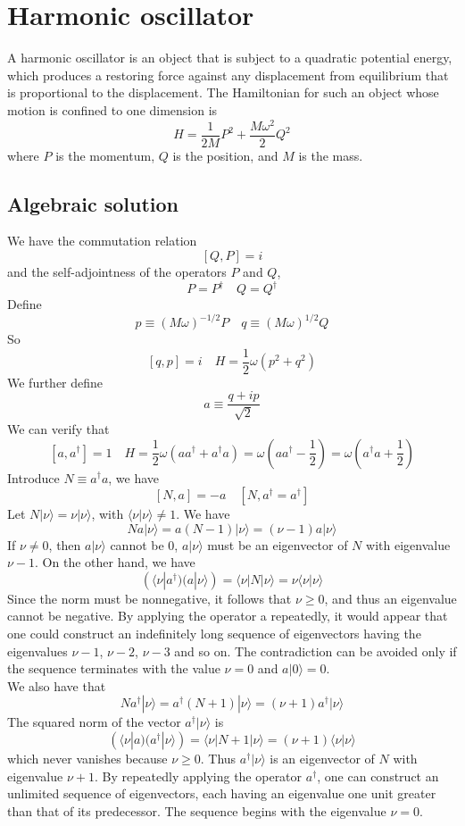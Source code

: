 \section{Harmonic oscillator}
A harmonic oscillator is an object that is subject to a quadratic potential energy, which produces a restoring force against any displacement from equilibrium that is proportional to the displacement. The Hamiltonian for such an object whose motion is confined to one dimension is
\[H = \frac{1}{2M}P^2 + \frac{M\omega^2}{2}Q^2\]
where $P$ is the momentum, $Q$ is the position, and $M$ is the mass.
\subsection{Algebraic solution}
We have the commutation relation
\[[Q,P] = i\]
and the self-adjointness of the operators $P$ and $Q$,
\[P = P^{\dagger} \quad Q = Q^{\dagger}\]
Define
\[ p \equiv (M\omega)^{-1/2}P \quad q \equiv (M\omega)^{1/2}Q\]
So
\[[q,p] = i \quad H = \frac{1}{2}\omega(p^2+q^2)\]
We further define
\[a \equiv \frac{q+ip}{\sqrt{2}}\]
We can verify that
\[[a,a^{\dagger}] = 1 \quad H = \frac{1}{2}\omega(aa^{\dagger}+a^{\dagger}a) = \omega(aa^{\dagger}-\frac{1}{2}) = \omega(a^{\dagger}a+\frac{1}{2})\]
Introduce $N \equiv a^{\dagger}a$, we have
\[[N,a] = -a \quad [N,a^{\dagger} = a^{\dagger}]\]
Let $N|\nu\rangle = \nu|\nu\rangle $, with $\langle \nu | \nu \rangle \neq 1$. We have
\[Na|\nu\rangle = a(N-1)|\nu\rangle = (\nu-1)a|\nu\rangle\]
If $\nu \neq 0$, then $a|\nu\rangle$ cannot be $0$, $a|\nu\rangle$ must be an eigenvector of $N$ with eigenvalue $\nu - 1$.
On the other hand, we have
\[(\langle \nu | a^{\dagger})(a|\nu\rangle) = \langle \nu | N | \nu \rangle = \nu \langle \nu | \nu \rangle\]
Since the norm must be nonnegative, it follows that $\nu \geq 0$, and thus an eigenvalue cannot be negative. By applying the operator a repeatedly, it would appear that one could construct an indefinitely long sequence of eigenvectors
having the eigenvalues $\nu-1$, $\nu-2$, $\nu-3$ and so on.
The contradiction can be avoided only if the sequence terminates with the value $\nu=0$ and $a|0\rangle = 0$.\\
We also have that
\[Na^{\dagger}|\nu\rangle = a^{\dagger}(N+1)|\nu\rangle = (\nu+1)a^{\dagger}|\nu\rangle\]
The squared norm of the vector $a^{\dagger} |\nu\rangle$ is
\[(\langle \nu | a)(a^{\dagger} | \nu \rangle)= \langle \nu | N+1|\nu\rangle = (\nu+1) \langle \nu | \nu \rangle \]
which never vanishes because $\nu \geq 0$. Thus $a^{\dagger} | \nu \rangle$ is an eigenvector of $N$ with eigenvalue $\nu+1$. By repeatedly applying the operator $a^{\dagger}$, one can construct an unlimited sequence of eigenvectors, each having an eigenvalue one unit greater than that of its predecessor. The sequence begins with the eigenvalue $\nu=0$.
